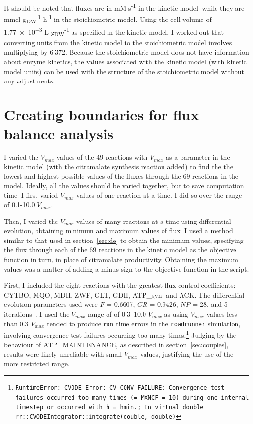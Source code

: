\documentclass[parskip=full, numbers=noenddot]{scrreprt}
\begin{document}
It should be noted that fluxes are in mM s\textsuperscript{-1} in the kinetic model, while they are mmol g\textsubscript{DW}\textsuperscript{-1} h\textsuperscript{-1} in the stoichiometric model. Using the cell volume of \num{1.77e-3} L g\textsubscript{DW}\textsuperscript{-1} as specified in the kinetic model, I worked out that converting units from the kinetic model to the stoichiometric model involves multiplying by 6.372. Because the stoichiometric model does not have information about enzyme kinetics, the values associated with the kinetic model (with kinetic model units) can be used with the structure of the stoichiometric model without any adjustments.

\section{Creating boundaries for flux balance analysis}
\label{sec:bounds}

I varied the $V_{max}$ values of the 49 reactions with $V_{max}$ as a parameter in the kinetic model (with the citramalate synthesis reaction added) to find the the lowest and highest possible values of the fluxes through the 69 reactions in the model. Ideally, all the values should be varied together, but to save computation time, I first varied $V_{max}$ values of one reaction at a time. I did so over the range of 0.1-10.0 $V_{max}$.

Then, I varied the $V_{max}$ values of many reactions at a time using differential evolution, obtaining minimum and maximum values of flux. I used a method similar to that used in section~\ref{sec:de} to obtain the minimum values, specifying the flux through each of the 69 reactions in the kinetic model as the objective function in turn, in place of citramalate productivity. Obtaining the maximum values was a matter of adding a minus sign to the objective function in the script.

First, I included the eight reactions with the greatest flux control coefficients: CYTBO, MQO, MDH, ZWF, GLT, GDH, ATP\_syn, and ACK. The differential evolution parameters used were $F$ = 0.6607, $CR$ = 0.9426, $NP$ = 28, and 5 iterations~\cite{pedersen_good_2010}. I used the $V_{max}$ range of of 0.3--10.0 $V_{max}$ as using $V_{max}$ values less than 0.3 $V_{max}$ tended to produce run time errors in the \texttt{roadrunner} simulation, involving convergence test failures occurring too many times.\footnote{\texttt{RuntimeError: CVODE Error: CV\_CONV\_FAILURE: Convergence test failures occurred too many times (= MXNCF = 10) during one internal timestep or occurred with \textbar{}h\textbar{} = hmin.; In virtual double rr::CVODEIntegrator::integrate(double, double)}} Judging by the behaviour of ATP\_MAINTENANCE, as described in section~\ref{sec:couples}, results were likely unreliable with small $V_{max}$ values, justifying the use of the more restricted range.
\end{document}
